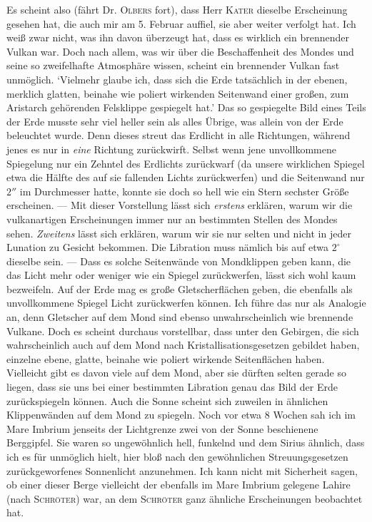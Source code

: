 Es scheint also (fährt Dr. \textsc{Olbers} fort), dass Herr \textsc{Kater} dieselbe Erscheinung gesehen hat, die auch mir am 5. Februar auffiel, sie aber weiter verfolgt hat. Ich weiß zwar nicht, was ihn davon überzeugt hat, dass es wirklich ein brennender Vulkan war. Doch nach allem, was wir über die Beschaffenheit des Mondes und seine so zweifelhafte Atmosphäre wissen, scheint ein brennender Vulkan fast unmöglich. `Vielmehr glaube ich, dass sich die Erde tatsächlich in der ebenen, merklich glatten, beinahe wie poliert wirkenden Seitenwand einer großen, zum Aristarch gehörenden Felsklippe gespiegelt hat.' Das so gespiegelte Bild eines Teils der Erde musste sehr viel heller sein als alles Übrige, was allein von der Erde beleuchtet wurde. Denn dieses streut das Erdlicht in alle Richtungen, während jenes es nur in \emph{eine} Richtung zurückwirft. Selbst wenn jene unvollkommene Spiegelung nur ein Zehntel des Erdlichts zurückwarf (da unsere wirklichen Spiegel etwa die Hälfte des auf sie fallenden Lichts zurückwerfen) und die Seitenwand nur $2''$ im Durchmesser hatte, konnte sie doch so hell wie ein Stern sechster Größe erscheinen. --- Mit dieser Vorstellung lässt sich \emph{erstens} erklären, warum wir die vulkanartigen Erscheinungen immer nur an bestimmten Stellen des Mondes sehen. \emph{Zweitens} lässt sich erklären, warum wir sie nur selten und nicht in jeder Lunation zu Gesicht bekommen. Die Libration muss nämlich bis auf etwa $2^\circ$ dieselbe sein. --- Dass es solche Seitenwände von Mondklippen geben kann, die das Licht mehr oder weniger wie ein Spiegel zurückwerfen, lässt sich wohl kaum bezweifeln. Auf der Erde mag es große Gletscherflächen geben, die ebenfalls als unvollkommene Spiegel Licht zurückwerfen können. Ich führe das nur als Analogie an, denn Gletscher auf dem Mond sind ebenso
%
unwahrscheinlich wie brennende Vulkane. Doch es scheint durchaus vorstellbar, dass unter den Gebirgen, die sich wahrscheinlich auch auf dem Mond nach Kristallisationsgesetzen gebildet haben, einzelne ebene, glatte, beinahe wie poliert wirkende Seitenflächen haben. Vielleicht gibt es davon viele auf dem Mond, aber sie dürften selten gerade so liegen, dass sie uns bei einer bestimmten Libration genau das Bild der Erde zurückspiegeln können. Auch die Sonne scheint sich zuweilen in ähnlichen Klippenwänden auf dem Mond zu spiegeln. Noch vor etwa 8 Wochen sah ich im Mare Imbrium jenseits der Lichtgrenze zwei von der Sonne beschienene Berggipfel. Sie waren so ungewöhnlich hell, funkelnd und dem Sirius ähnlich, dass ich es für unmöglich hielt, hier bloß nach den gewöhnlichen Streuungsgesetzen zurückgeworfenes Sonnenlicht anzunehmen. Ich kann nicht mit Sicherheit sagen, ob einer dieser Berge vielleicht der ebenfalls im Mare Imbrium gelegene Lahire (nach \textsc{Schröter}) war, an dem \textsc{Schröter} ganz ähnliche Erscheinungen beobachtet hat.

